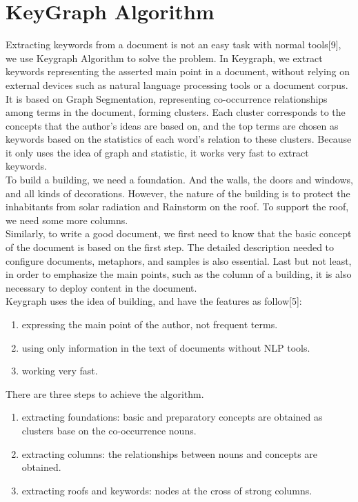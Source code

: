 \section{KeyGraph Algorithm}
Extracting keywords from a document is not an easy task with normal tools[9], we use Keygraph Algorithm to solve the problem. In Keygraph, we extract keywords representing the asserted main point in a document, without relying on external devices such as natural language processing tools or a document corpus. It is based on Graph Segmentation, representing co-occurrence relationships among terms in the document, forming clusters. Each cluster corresponds to the concepts that the author's ideas are based on, and the top terms are chosen as keywords based on the statistics of each word's relation to these clusters. Because it only uses the idea of graph and statistic, it works very fast to extract keywords.\\
To build a building, we need a foundation. And the walls, the doors and windows, and all kinds of decorations. However, the nature of the building is to protect the inhabitants from solar radiation and Rainstorm on the roof. To support the roof, we need some more columns.\\
Similarly, to write a good document, we first need to know that the basic concept of the document is based on the first step. The detailed description needed to configure documents, metaphors, and samples is also essential. Last but not least, in order to emphasize the main points, such as the column of a building, it is also necessary to deploy content in the document.\\
Keygraph uses the idea of building, and have the features as follow[5]:
\begin{enumerate}
\item expressing the main point of the author, not frequent terms.
\item using only information in the text of documents without NLP tools.
\item working very fast.
\end{enumerate}
There are three steps to achieve the algorithm.
\begin{enumerate}
\item extracting foundations: basic and preparatory concepts are obtained as clusters base on the co-occurrence nouns.
\item extracting columns: the relationships between nouns and concepts are obtained.
\item extracting roofs and keywords: nodes at the cross of strong columns.
\end{enumerate}
